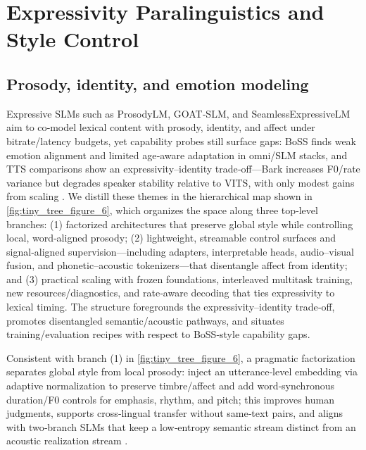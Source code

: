 \section{Expressivity Paralinguistics and Style Control} \label{sec:Expressivity Paralinguistics and Style Control}

\subsection{Prosody, identity, and emotion modeling} \label{subsec:Prosody, identity, and emotion modeling}
Expressive SLMs such as ProsodyLM, GOAT‑SLM, and SeamlessExpressiveLM aim to co‑model lexical content with prosody, identity, and affect under bitrate/latency budgets, yet capability probes still surface gaps: BoSS finds weak emotion alignment and limited age‑aware adaptation in omni/SLM stacks, and TTS comparisons show an expressivity–identity trade‑off—Bark increases F0/rate variance but degrades speaker stability relative to VITS, with only modest gains from scaling \cite{wang2025bossbeyondsemanticspeech,wang2024evaluatingtextspeechsynthesislargediscre}. We distill these themes in the hierarchical map shown in \autoref{fig:tiny_tree_figure_6}, which organizes the space along three top‑level branches: (1) factorized architectures that preserve global style while controlling local, word‑aligned prosody; (2) lightweight, streamable control surfaces and signal‑aligned supervision—including adapters, interpretable heads, audio–visual fusion, and phonetic–acoustic tokenizers—that disentangle affect from identity; and (3) practical scaling with frozen foundations, interleaved multitask training, new resources/diagnostics, and rate‑aware decoding that ties expressivity to lexical timing. The structure foregrounds the expressivity–identity trade‑off, promotes disentangled semantic/acoustic pathways, and situates training/evaluation recipes with respect to BoSS‑style capability gaps.

Consistent with branch (1) in \autoref{fig:tiny_tree_figure_6}, a pragmatic factorization separates global style from local prosody: inject an utterance‑level embedding via adaptive normalization to preserve timbre/affect and add word‑synchronous duration/F0 controls for emphasis, rhythm, and pitch; this improves human judgments, supports cross‑lingual transfer without same‑text pairs, and aligns with two‑branch SLMs that keep a low‑entropy semantic stream distinct from an acoustic realization stream \cite{huang2023holisticcascadesystembenchmarkhumanevalu}. 

